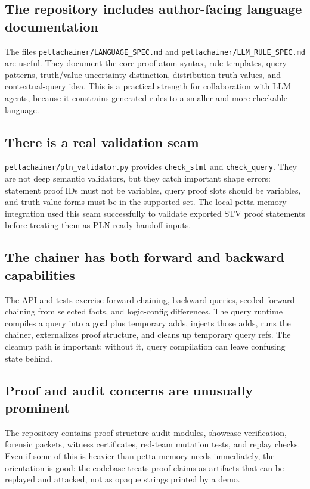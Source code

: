\documentclass[11pt]{article}
\newcommand{\code}[1]{\texttt{#1}}
\newcommand{\fpath}[1]{\texttt{#1}}
\begin{document}
\subsection{The repository includes author-facing language documentation}

The files \fpath{pettachainer/LANGUAGE\_SPEC.md} and
\fpath{pettachainer/LLM\_RULE\_SPEC.md} are useful.  They document the core proof
atom syntax, rule templates, query patterns, truth/value uncertainty distinction,
distribution truth values, and contextual-query idea.  This is a practical
strength for collaboration with LLM agents, because it constrains generated
rules to a smaller and more checkable language.

\subsection{There is a real validation seam}

\fpath{pettachainer/pln\_validator.py} provides \code{check\_stmt} and
\code{check\_query}.  They are not deep semantic validators, but they catch
important shape errors: statement proof IDs must not be variables, query proof
slots should be variables, and truth-value forms must be in the supported set.
The local petta-memory integration used this seam successfully to validate
exported STV proof statements before treating them as PLN-ready handoff inputs.

\subsection{The chainer has both forward and backward capabilities}

The API and tests exercise forward chaining, backward queries, seeded forward
chaining from selected facts, and logic-config differences.  The query runtime
compiles a query into a goal plus temporary adds, injects those adds, runs the
chainer, externalizes proof structure, and cleans up temporary query refs.  The
cleanup path is important: without it, query compilation can leave confusing
state behind.

\subsection{Proof and audit concerns are unusually prominent}

The repository contains proof-structure audit modules, showcase verification,
forensic packets, witness certificates, red-team mutation tests, and replay
checks.  Even if some of this is heavier than petta-memory needs immediately,
the orientation is good: the codebase treats proof claims as artifacts that can
be replayed and attacked, not as opaque strings printed by a demo.
\end{document}

